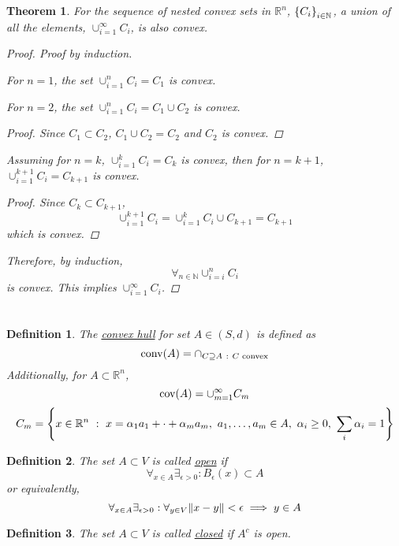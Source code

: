 \documentclass[]{article}
\newcommand{\R}{\mathbb{R}}
\newcommand{\N}{\mathbb{N}}
\newcommand{\st}{\ : \ }
\newtheorem{definition}{Definition}
\newtheorem{theorem}{Theorem}
\begin{document}
\begin{theorem}
    For the sequence of nested convex sets in $\R^n$, $\qty{C_i}_{i \in \N}$, a union of all the elements, $\cup_{i = 1}^\infty C_i$, is also convex.
    \begin{proof}
        Proof by induction.
        
        For $n = 1$, the set $\cup_{i = 1}^n C_i = C_1$ is convex.
        
        For $n = 2$, the set $\cup_{i = 1}^n C_i = C_1 \cup C_2$ is convex.
        \begin{proof}
            Since $C_1 \subset C_2$, $C_1 \cup C_2 = C_2$ and $C_2$ is convex.
        \end{proof}

        Assuming for $n = k$, $\cup_{i = 1}^k C_i = C_k$ is convex, 
        then for $n = k+1$, $\cup_{i = 1}^{k + 1} C_i = C_{k + 1}$ is convex.
        \begin{proof}
            Since $C_k \subset C_{k+1}$, \[
                \cup_{i = 1}^{k + 1} C_i = \cup_{i = 1}^{k} C_i \cup C_{k + 1} = C_{k + 1}
            \]
            which is convex.
        \end{proof}

        Therefore, by induction, \[
            \forall_{n \in \N} \cup_{i = i}^n C_i
        \]
        is convex.
        This implies $\cup_{i = 1}^\infty C_i$.
    \end{proof}
\end{theorem}

\newpage
\section{}

\begin{definition}
    The \emph{\underline{convex hull}} for set $A \in (S,d)$ is defined as \[
        \textnormal{conv}(A) = \cap_{C \supseteq A \st C \textnormal{ convex}}
    \]
    Additionally, for $A \subset \R^n$, \[
        \textnormal{cov}(A) = \cup_{m = 1}^{\infty} C_m
    \]\[
        C_m = \qty{
            x \in \R^n \st
            x = \alpha_1 a_1 + \cdot + \alpha_m a_m, \
            a_1, \dots, a_m \in A, \
            \alpha_i \geq 0, \
            \sum_{i} \alpha_i = 1
        }
    \]
\end{definition}
\begin{definition}
    The set $A \subset V$ is called \underline{open} if \[ 
        \forall_{x\in A} \exists_{\epsilon>0} : B_\epsilon(x)\subset A
    \]
    or equivalently, \[
        \forall_{x \in A} \exists_{\epsilon>0} : \forall_{y \in V}\norm{x - y} < \epsilon \implies y \in A
    \]
\end{definition}
\begin{definition}
    The set $A \subset V$ is called \underline{closed} if $A^c$ is open.
\end{definition}
\end{document}
